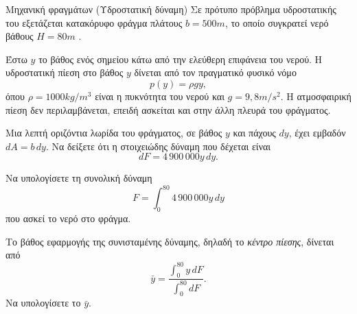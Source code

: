 \begin{problhma}{Μηχανική φραγμάτων (Υδροστατική δύναμη)}
Σε πρότυπο πρόβλημα υδροστατικής του  εξετάζεται κατακόρυφο
φράγμα πλάτους $b=500\si{m}$, το οποίο συγκρατεί νερό βάθους
$H=80\si{m}$ \cite{ling2016universityPhysics1Fluids}.

Έστω $y$ το βάθος ενός σημείου κάτω από την ελεύθερη επιφάνεια του
νερού. Η υδροστατική πίεση στο βάθος $y$ δίνεται από τον πραγματικό
φυσικό νόμο
\[
  p(y)=\rho gy,
\]
όπου $\rho=1000\si{kg/m^3}$ είναι η πυκνότητα του νερού και
$g=9{,}8\si{m/s^2}$. Η ατμοσφαιρική πίεση δεν περιλαμβάνεται, επειδή
ασκείται και στην άλλη πλευρά του φράγματος.

\begin{alist}
\item Μια λεπτή οριζόντια λωρίδα του φράγματος, σε βάθος $y$ και πάχους
      $dy$, έχει εμβαδόν $dA=b\,dy$. Να δείξετε ότι η στοιχειώδης δύναμη
      που δέχεται είναι
      \[
        dF=4\,900\,000y\,dy.
      \]
\item Να υπολογίσετε τη συνολική δύναμη
      \[
        F=\int_0^{80}4\,900\,000y\,dy
      \]
      που ασκεί το νερό στο φράγμα.
\item Το βάθος εφαρμογής της συνισταμένης δύναμης, δηλαδή το
      \emph{κέντρο πίεσης}, δίνεται από
      \[
        \bar y=
        \frac{\displaystyle\int_0^{80}y\,dF}
             {\displaystyle\int_0^{80}dF}.
      \]
      Να υπολογίσετε το $\bar y$.
\end{alist}

\begin{center}
\end{center}
\end{problhma}
